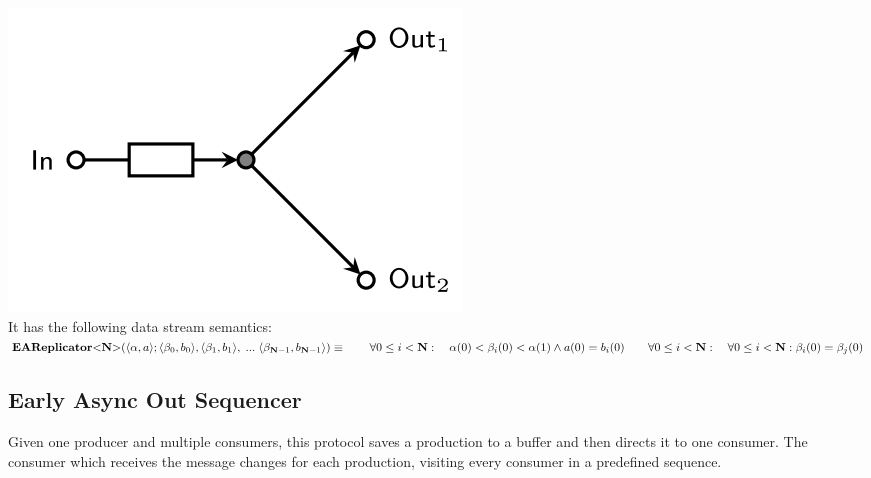 \includegraphics[]{img/EARep.png}\\
%
It has the following data stream semantics:\\
%
$
\vspace{0.2cm}\earep (\langle \alpha, a \rangle ; \langle \beta_0, b_0 \rangle, \langle \beta_1, b_1 \rangle,\; ... \; \langle \beta_{\textbf{N}-1}, b_{\textbf{N}-1} \rangle) \equiv \\
\vspace{0.2cm} \hphantom \qquad \forall 0 \leq i < \textbf{N} : \quad \alpha(0) < \beta_i(0) < \alpha(1) \land a(0) = b_i(0) \\
\hphantom \qquad\forall 0 \leq i < \textbf{N} :\quad \forall 0 \leq i < \textbf{N} : \beta_i(0) = \beta_j(0)
$\\

\subsection{Early Async Out Sequencer}
Given one producer and multiple consumers, this protocol saves a production to a buffer and then directs it to one consumer. The consumer which receives the message changes for each production, visiting every consumer in a predefined sequence.\\

